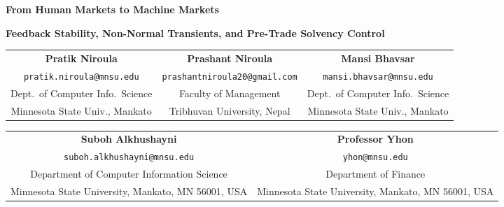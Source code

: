 \documentclass[11pt]{article}
\theoremstyle{remark}
\begin{document}

\begin{titlepage}
\thispagestyle{empty}
\begin{center}
\vspace*{0.15cm}
{\LARGE \textbf{From Human Markets to Machine Markets}\par}
\vspace{0.18cm}
{\normalsize \textbf{Feedback Stability, Non-Normal Transients, and Pre-Trade Solvency Control}\par}
\vspace{0.35cm}
\begin{tabular}{ccc}
\textbf{Pratik Niroula} & \textbf{Prashant Niroula} & \textbf{Mansi Bhavsar} \\
\footnotesize\texttt{pratik.niroula@mnsu.edu} & \footnotesize\texttt{prashantniroula20@gmail.com} & \footnotesize\texttt{mansi.bhavsar@mnsu.edu} \\
\footnotesize Dept.\ of Computer Info.\ Science & \footnotesize Faculty of Management & \footnotesize Dept.\ of Computer Info.\ Science \\
\footnotesize Minnesota State Univ., Mankato & \footnotesize Tribhuvan University, Nepal & \footnotesize Minnesota State Univ., Mankato
\end{tabular}

\vspace{0.25cm}
\begin{tabular}{cc}
\textbf{Suboh Alkhushayni} & \textbf{Professor Yhon} \\
\footnotesize\texttt{suboh.alkhushayni@mnsu.edu} & \footnotesize\texttt{yhon@mnsu.edu} \\
\footnotesize Department of Computer Information Science & \footnotesize Department of Finance \\
\footnotesize Minnesota State University, Mankato, MN 56001, USA & \footnotesize Minnesota State University, Mankato, MN 56001, USA
\end{tabular}
\vspace{0.28cm}


\end{center}
\end{titlepage}
\end{document}
